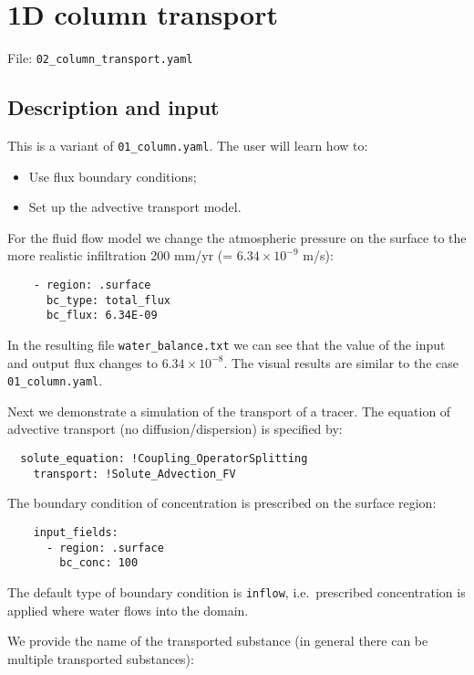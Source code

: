 \section{1D column transport}

File: \texttt{02\_column\_transport.yaml}

\subsection{Description and input}

This is a variant of \texttt{01\_column.yaml}. The user will learn how
to:

\begin{itemize}
\tightlist
\item
  Use flux boundary conditions;
\item
  Set up the advective transport model.
\end{itemize}

For the fluid flow model we change the atmospheric pressure on the
surface to the more realistic infiltration 200 mm/yr (=
\(6.34\times 10^{-9}\) m/s):

\begin{verbatim}
    - region: .surface
      bc_type: total_flux
      bc_flux: 6.34E-09
\end{verbatim}

In the resulting file \texttt{water\_balance.txt} we can see that the
value of the input and output flux changes to \(6.34 \times 10^{-8}\).
The visual results are similar to the case \texttt{01\_column.yaml}.

Next we demonstrate a simulation of the transport of a tracer. The
equation of advective transport (no diffusion/dispersion) is specified
by:

\begin{verbatim}
  solute_equation: !Coupling_OperatorSplitting
    transport: !Solute_Advection_FV
\end{verbatim}

The boundary condition of concentration is prescribed on the surface
region:

\begin{verbatim}
    input_fields:
      - region: .surface
        bc_conc: 100
\end{verbatim}

The default type of boundary condition is \texttt{inflow},
i.e.~prescribed concentration is applied where water flows into the
domain.

We provide the name of the transported substance (in general there can
be multiple transported substances):

